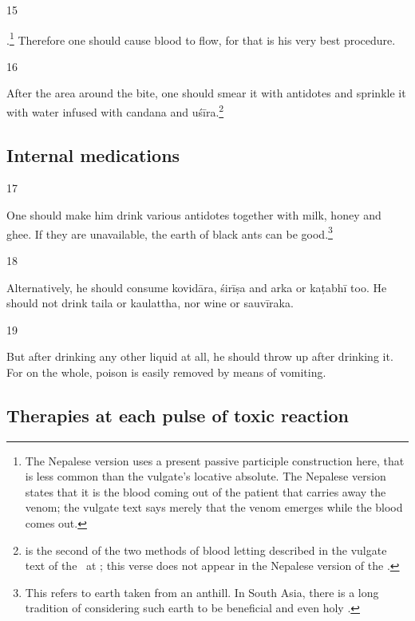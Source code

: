 \begin{translation}
\item [15] 

.\footnote{The
    Nepalese version uses a present passive participle construction here,
    that is less common than the vulgate's locative absolute.  The Nepalese 
    version states that it is the blood coming out of the patient that carries away 
    the venom; the vulgate text says merely that the venom emerges while the 
    blood comes out.} Therefore one
    should cause blood to flow, for that is his very best procedure.

\item [16]  

After  the area around the bite, one should smear
it with antidotes and sprinkle it with water infused with
\gls{candana} and \gls{uśīra}.\footnote{ is the second of
    the two methods of blood letting  described in the vulgate text of the \SS\ at 
    ; this verse does not appear in the Nepalese version of the 
    \SS.\label{pracchana}}\label{5.5.16}

\subsection{Internal medications}

\item [17]

One should make him drink various antidotes together
with milk, honey and ghee. If they are unavailable, the earth of black
ants can be good.\footnote{This refers to earth taken from an anthill. 
    In South Asia, there is a long tradition of considering such earth to be
    beneficial and even holy \citep[e.g.,][]{irwi-1982}.}


\item [18]

Alternatively, he should consume \gls{kovidāra}, \gls{śirīṣa}
and \gls{arka} or \gls{kaṭabhī} too.  He should not drink \gls{taila} or
\gls{kaulattha}, nor wine or  \gls{sauvīraka}.


\item [19]

But after drinking any other liquid at all, he should throw up after drinking it.  For 
on the whole, poison is easily removed by means of vomiting. 

\subsection{Therapies at each pulse of toxic reaction}


\end{translation}
